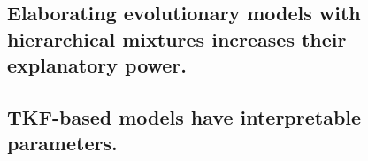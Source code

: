 



\subsection{Elaborating evolutionary models with hierarchical mixtures increases their explanatory power.}



\subsection{TKF-based models have interpretable parameters.}

